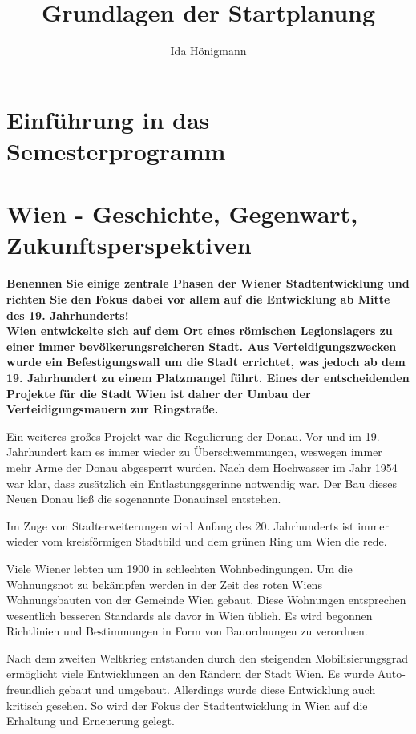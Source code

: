 \documentclass[]{article}
\title{Grundlagen der Startplanung}
\author{Ida Hönigmann}
\newenvironment{question}{\vspace{3mm}\noindent\bfseries}{\\}
\begin{document}
\maketitle

\section{Einführung in das Semesterprogramm}

\section{Wien - Geschichte, Gegenwart, Zukunftsperspektiven}
\begin{question}
	Benennen Sie einige zentrale Phasen der Wiener Stadtentwicklung und richten Sie den Fokus dabei vor allem auf die Entwicklung ab Mitte des 19. Jahrhunderts!
\end{question}
Wien entwickelte sich auf dem Ort eines römischen Legionslagers zu einer immer bevölkerungsreicheren Stadt. Aus Verteidigungszwecken wurde ein Befestigungswall um die Stadt errichtet, was jedoch ab dem 19. Jahrhundert zu einem Platzmangel führt. Eines der entscheidenden Projekte für die Stadt Wien ist daher der Umbau der Verteidigungsmauern zur Ringstraße.

Ein weiteres großes Projekt war die Regulierung der Donau. Vor und im 19. Jahrhundert kam es immer wieder zu Überschwemmungen, weswegen immer mehr Arme der Donau abgesperrt wurden. Nach dem Hochwasser im Jahr 1954 war klar, dass zusätzlich ein Entlastungsgerinne notwendig war. Der Bau dieses Neuen Donau ließ die sogenannte Donauinsel entstehen.

Im Zuge von Stadterweiterungen wird Anfang des 20. Jahrhunderts ist immer wieder vom kreisförmigen Stadtbild und dem grünen Ring um Wien die rede.

Viele Wiener lebten um 1900 in schlechten Wohnbedingungen. Um die Wohnungsnot zu bekämpfen werden in der Zeit des roten Wiens Wohnungsbauten von der Gemeinde Wien gebaut. Diese Wohnungen entsprechen wesentlich besseren Standards als davor in Wien üblich. Es wird begonnen Richtlinien und Bestimmungen in Form von Bauordnungen zu verordnen.

Nach dem zweiten Weltkrieg entstanden durch den steigenden Mobilisierungsgrad ermöglicht viele Entwicklungen an den Rändern der Stadt Wien. Es wurde Auto-freundlich gebaut und umgebaut. Allerdings wurde diese Entwicklung auch kritisch gesehen. So wird der Fokus der Stadtentwicklung in Wien auf die Erhaltung und Erneuerung gelegt.
\end{document}
